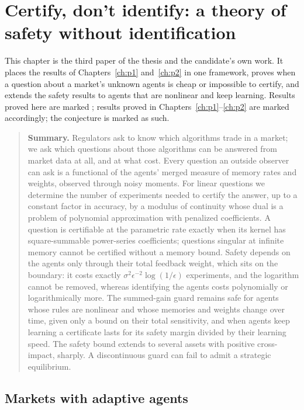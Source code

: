 \chapter{Certify, don't identify: a theory of safety without identification}\label{ch:p3}

This chapter is the third paper of the thesis and the candidate's own work. It places the results of Chapters~\ref{ch:p1} and~\ref{ch:p2} in one framework, proves when a question about a market's unknown agents is cheap or impossible to certify, and extends the safety results to agents that are nonlinear and keep learning. Results proved here are marked \Proved{}; results proved in Chapters~\ref{ch:p1}--\ref{ch:p2} are marked accordingly; the conjecture is marked as such.

\begin{quote}\small\textbf{Summary.} Regulators ask to know which algorithms trade in a market; we ask which questions about those algorithms can be answered from market data at all, and at what cost. Every question an outside observer can ask is a functional of the agents' merged measure of memory rates and weights, observed through noisy moments. For linear questions we determine the number of experiments needed to certify the answer, up to a constant factor in accuracy, by a modulus of continuity whose dual is a problem of polynomial approximation with penalized coefficients. A question is certifiable at the parametric rate exactly when its kernel has square-summable power-series coefficients; questions singular at infinite memory cannot be certified without a memory bound. Safety depends on the agents only through their total feedback weight, which sits on the boundary: it costs exactly $\sigma^2\epsilon^{-2}\log(1/\epsilon)$ experiments, and the logarithm cannot be removed, whereas identifying the agents costs polynomially or logarithmically more. The summed-gain guard remains safe for agents whose rules are nonlinear and whose memories and weights change over time, given only a bound on their total sensitivity, and when agents keep learning a certificate lasts for its safety margin divided by their learning speed. The safety bound extends to several assets with positive cross-impact, sharply. A discontinuous guard can fail to admit a strategic equilibrium.\end{quote}

\section{Markets with adaptive agents}\label{sec:fw_model}

